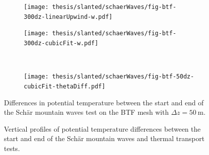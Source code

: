 \begin{figure}
	\centering
	\begin{subfigure}{0.55\textwidth}
		\centering
		\texttt{[image: thesis/slanted/schaerWaves/fig-btf-300dz-linearUpwind-w.pdf]}
		\caption{}
		\label{fig:slanted:schaerWaves:w:linearUpwind}
	\end{subfigure}
	\begin{subfigure}{0.44\textwidth}
		\centering
		\texttt{[image: thesis/slanted/schaerWaves/fig-btf-300dz-cubicFit-w.pdf]}
		\caption{}
		\label{fig:slanted:schaerWaves:w:cubicFit}
	\end{subfigure}
	\\
	\begin{subfigure}{0.55\textwidth}
		\centering
		\caption{}
		\label{fig:slanted:schaerWaves:w:cp}
	\end{subfigure}
	\begin{subfigure}{0.44\textwidth}
		\centering
		\caption{\citep{melvin2010}}
		\label{fig:slanted:schaerWaves:w:melvin}
	\end{subfigure}
	\caption{ }
	\label{fig:slanted:schaerWaves:w}
\end{figure}

\begin{figure}
	\centering
	\begin{subfigure}{\textwidth}
		\centering
		\texttt{[image: thesis/slanted/schaerWaves/fig-btf-50dz-cubicFit-thetaDiff.pdf]}
	\end{subfigure}
	\caption{Differences in potential temperature between the start and end of the Sch\"{a}r mountain waves test on the BTF mesh with $\Delta z = \SI{50}{\meter}$.  }
	\label{fig:slanted:schaerWaves:thetaDiff}
\end{figure}

\begin{figure}
	
	\caption{Vertical profiles of potential temperature differences between the start and end of the Sch\"{a}r mountain waves and thermal transport tests.  \TODO{}}
	\label{fig:slanted:sampleLines}
\end{figure}
